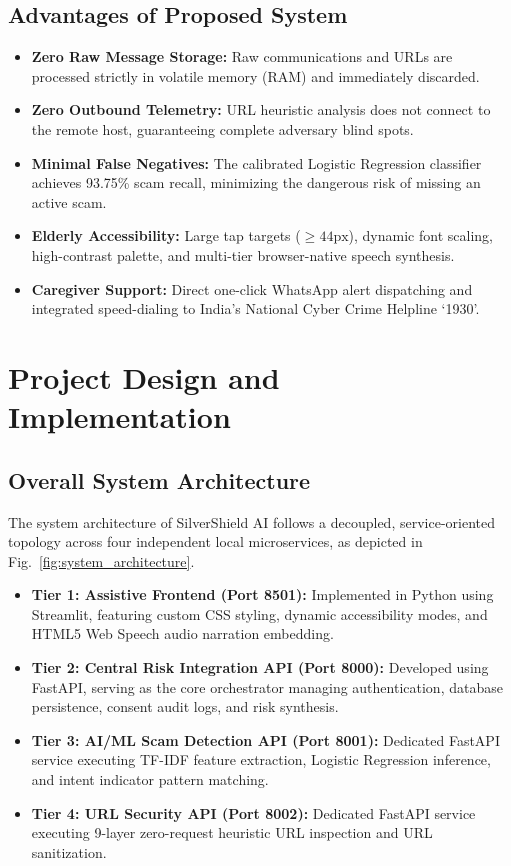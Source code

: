 \documentclass[conference]{IEEEtran}
\begin{document}
\subsection{Advantages of Proposed System}
\begin{itemize}
    \item \textbf{Zero Raw Message Storage:} Raw communications and URLs are processed strictly in volatile memory (RAM) and immediately discarded.
    \item \textbf{Zero Outbound Telemetry:} URL heuristic analysis does not connect to the remote host, guaranteeing complete adversary blind spots.
    \item \textbf{Minimal False Negatives:} The calibrated Logistic Regression classifier achieves 93.75\% scam recall, minimizing the dangerous risk of missing an active scam.
    \item \textbf{Elderly Accessibility:} Large tap targets ($\ge 44\text{px}$), dynamic font scaling, high-contrast palette, and multi-tier browser-native speech synthesis.
    \item \textbf{Caregiver Support:} Direct one-click WhatsApp alert dispatching and integrated speed-dialing to India's National Cyber Crime Helpline `1930'.
\end{itemize}

\section{Project Design and Implementation}

\subsection{Overall System Architecture}
The system architecture of SilverShield AI follows a decoupled, service-oriented topology across four independent local microservices, as depicted in Fig.~\ref{fig:system_architecture}.
\begin{itemize}
    \item \textbf{Tier 1: Assistive Frontend (Port 8501):} Implemented in Python using Streamlit, featuring custom CSS styling, dynamic accessibility modes, and HTML5 Web Speech audio narration embedding.
    \item \textbf{Tier 2: Central Risk Integration API (Port 8000):} Developed using FastAPI, serving as the core orchestrator managing authentication, database persistence, consent audit logs, and risk synthesis.
    \item \textbf{Tier 3: AI/ML Scam Detection API (Port 8001):} Dedicated FastAPI service executing TF-IDF feature extraction, Logistic Regression inference, and intent indicator pattern matching.
    \item \textbf{Tier 4: URL Security API (Port 8002):} Dedicated FastAPI service executing 9-layer zero-request heuristic URL inspection and URL sanitization.
\end{itemize}
\end{document}

